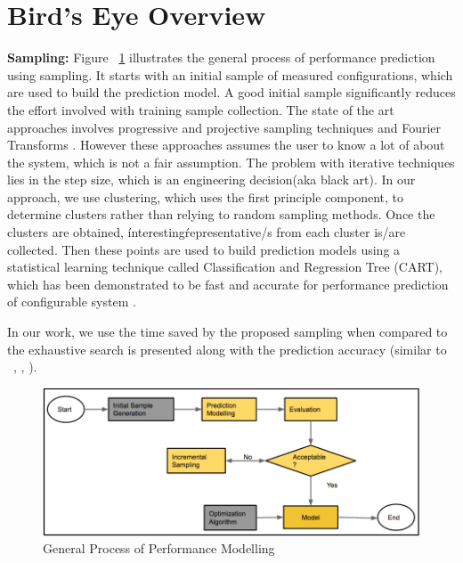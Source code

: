 \documentclass{sig-alternative}
\begin{document}
\section{Bird's Eye Overview}


    \textbf{Sampling: } Figure ~\ref{fig:GeneralProcess} illustrates the general process of performance prediction using sampling. It starts with an initial sample of measured configurations, which are used to build the prediction model. A good initial sample significantly reduces the effort involved with training sample collection. The state of the art approaches involves progressive and projective sampling techniques \cite{sarkar2015cost} and Fourier Transforms \cite{zhang2015performance}. However these approaches assumes the user to know a lot of about the system, which is not a fair assumption. The problem with iterative techniques lies in the step size, which is an engineering decision(aka black art). In our approach, we use clustering, which uses the first principle component, to determine clusters rather than relying to random sampling methods. Once the clusters are obtained, \'interesting\' representative/s from each cluster  is/are collected. Then these points are used to build prediction models using a statistical learning technique called Classification and Regression Tree (CART), which has been demonstrated to be fast and accurate for performance prediction of configurable system \cite{guo2013variability}.
    
In our work, we use the time saved by the proposed sampling when compared to the exhaustive search is presented along with the prediction accuracy (similar to ~\cite{guo2013variability}, \cite{siegmund2012predicting}, \cite{westermann2012automated}). 
    \begin{figure}[!t]
\includegraphics[width=0.9\linewidth]{Figures/GeneralProcess.png}
\caption{ General Process of Performance Modelling }\label{fig:GeneralProcess}
\end{figure}
\end{document}
